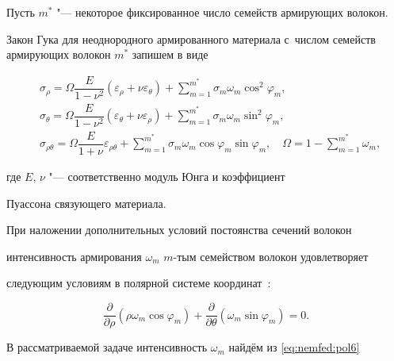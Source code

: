 Пусть $m^*$ "--- некоторое фиксированное число семейств армирующих волокон. 

Закон Гука для неоднородного армированного материала с~числом семейств армирующих волокон $m^*$  запишем в виде

\begin{equation}

\label{eq:nemfed:p}

\begin{aligned}

&\sigma_\rho=\Omega\dfrac{E}{1-\nu^2}(\varepsilon_\rho+\nu\varepsilon_\theta

)+\sum_{m=1}^{m^*}\sigma_m\omega_m\cos^2\varphi_m,\\

&\sigma_\theta=\Omega\dfrac{E}{1-\nu^2}(\varepsilon_\theta+\nu\varepsilon_\rho)+

\sum_{m=1}^{m^*}\sigma_m\omega_m\sin^2\varphi_m,\\

&\sigma_{\rho\theta}=\Omega\dfrac{E}{1+\nu}\varepsilon_{\rho\theta}+

\sum_{m=1}^{m^*}\sigma_m\omega_m\cos\varphi_m\sin\varphi_m,\quad

\Omega=1-\sum_{m=1}^{m^{*}}\omega_m,

\end{aligned}

\end{equation}

где $E$, $\nu$ "--- соответственно модуль Юнга и коэффициент

Пуассона связующего материала.



При наложении дополнительных условий постоянства сечений волокон \cite{nemfed:bib:BushNem}

интенсивность армирования $\omega_m$  $m$-тым семейством волокон  удовлетворяет

следующим условиям в полярной системе координат~\cite{nemfed:bib:NFSam}:

\begin{equation}

\label{eq:nemfed:pol6}

\dfrac{\partial}{\partial\rho}(\rho\omega_m\cos\varphi_m)+\dfrac{\partial}{\partial\theta}(\omega_m\sin\varphi_m)=0.

 \end{equation}



В рассматриваемой задаче интенсивность  $\omega_m$ найдём из \eqref{eq:nemfed:pol6}

